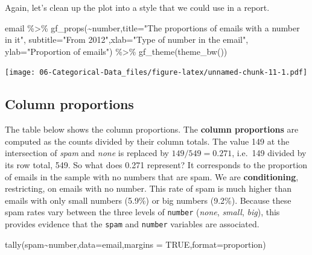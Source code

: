 \documentclass[
]{book}
\newenvironment{Shaded}{\begin{snugshade}}{\end{snugshade}}
\newcommand{\AttributeTok}[1]{\textcolor[rgb]{0.77,0.63,0.00}{#1}}
\newcommand{\ConstantTok}[1]{\textcolor[rgb]{0.00,0.00,0.00}{#1}}
\newcommand{\FunctionTok}[1]{\textcolor[rgb]{0.00,0.00,0.00}{#1}}
\newcommand{\NormalTok}[1]{#1}
\newcommand{\SpecialCharTok}[1]{\textcolor[rgb]{0.00,0.00,0.00}{#1}}
\newcommand{\StringTok}[1]{\textcolor[rgb]{0.31,0.60,0.02}{#1}}
\begin{document}
Again, let's clean up the plot into a style that we could use in a report.

\begin{Shaded}
\begin{Highlighting}[]
\NormalTok{email }\SpecialCharTok{\%\textgreater{}\%}
  \FunctionTok{gf\_props}\NormalTok{(}\SpecialCharTok{\textasciitilde{}}\NormalTok{number,}\AttributeTok{title=}\StringTok{"The proportions of emails with a number in it"}\NormalTok{,}
           \AttributeTok{subtitle=}\StringTok{"From 2012"}\NormalTok{,}\AttributeTok{xlab=}\StringTok{"Type of number in the email"}\NormalTok{,}
           \AttributeTok{ylab=}\StringTok{"Proportion of emails"}\NormalTok{) }\SpecialCharTok{\%\textgreater{}\%}
  \FunctionTok{gf\_theme}\NormalTok{(}\FunctionTok{theme\_bw}\NormalTok{())}
\end{Highlighting}
\end{Shaded}

\texttt{[image: 06-Categorical-Data\_files/figure-latex/unnamed-chunk-11-1.pdf]}

\hypertarget{column-proportions}{%
\subsection{Column proportions}\label{column-proportions}}

The table below shows the column proportions. The \textbf{column proportions} are computed as the counts divided by their column totals. The value 149 at the intersection of \emph{spam} and \emph{none} is replaced by \(149/549=0.271\), i.e.~149 divided by its row total, 549. So what does 0.271 represent? It corresponds to the proportion of emails in the sample with no numbers that are spam. We are \textbf{conditioning}, restricting, on emails with no number. This rate of spam is much higher than emails with only small numbers (5.9\%) or big numbers (9.2\%). Because these spam rates vary between the three levels of \texttt{number} (\emph{none}, \emph{small}, \emph{big}), this provides evidence that the \texttt{spam} and \texttt{number} variables are associated.

\begin{Shaded}
\begin{Highlighting}[]
\FunctionTok{tally}\NormalTok{(spam}\SpecialCharTok{\textasciitilde{}}\NormalTok{number,}\AttributeTok{data=}\NormalTok{email,}\AttributeTok{margins =} \ConstantTok{TRUE}\NormalTok{,}\AttributeTok{format=}\StringTok{\textquotesingle{}proportion\textquotesingle{}}\NormalTok{)}
\end{Highlighting}
\end{Shaded}
\end{document}

